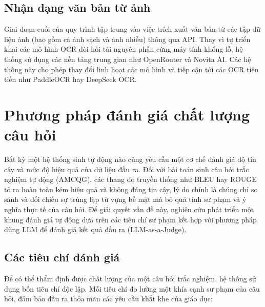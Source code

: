 \subsection{Nhận dạng văn bản từ ảnh}

Giai đoạn cuối của quy trình tập trung vào việc trích xuất văn bản từ các tập dữ liệu ảnh (bao gồm cả ảnh sạch và ảnh nhiễu) thông qua API. Thay vì tự triển khai các mô hình OCR đòi hỏi tài nguyên phần cứng máy tính khổng lồ, hệ thống sử dụng các nền tảng trung gian như OpenRouter và Novita AI. Các hệ thống này cho phép thay đổi linh hoạt các mô hình và tiếp cận tới các OCR tiên tiến như PaddleOCR hay DeepSeek OCR.

\section{Phương pháp đánh giá chất lượng câu hỏi}

Bất kỳ một hệ thống sinh tự động nào cũng yêu cầu một cơ chế đánh giá độ tin cậy và mức độ hiệu quả của dữ liệu đầu ra. Đối với bài toán sinh câu hỏi trắc nghiệm tự động (AMCQG), các thang đo truyền thống như BLEU hay ROUGE tỏ ra hoàn toàn kém hiệu quả và không đáng tin cậy, lý do chính là chúng chỉ so sánh và đối chiếu sự trùng lặp từ vựng bề mặt mà bỏ quá tính sư phạm và ý nghĩa thực tế của câu hỏi. Để giải quyết vấn đề này, nghiên cứu phát triển một khung đánh giá tự động dựa trên các tiêu chí sư phạm kết hợp với phương pháp dùng LLM để đánh giá kết quả đầu ra (LLM-as-a-Judge).

\subsection{Các tiêu chí đánh giá}

Để có thể thẩm định được chất lượng của một câu hỏi trắc nghiệm, hệ thống sử dụng bốn tiêu chí độc lập. Mỗi tiêu chí đo lường một khía cạnh sư phạm của câu hỏi, đảm bảo đầu ra thỏa mãn các yêu cầu khắt khe của giáo dục:

